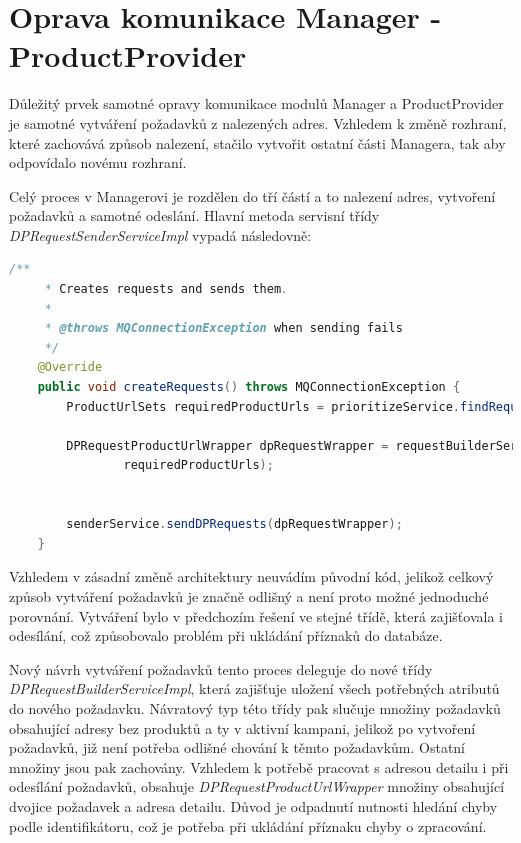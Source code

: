 \documentclass[thesis=B,czech]{FITthesis}[2012/06/26]
\begin{document}
\section{Oprava komunikace Manager - ProductProvider}
Důležitý prvek samotné opravy komunikace modulů Manager a ProductProvider je samotné vytváření požadavků z nalezených adres.
Vzhledem k změně rozhraní, které zachovává způsob nalezení, stačilo vytvořit ostatní části Managera, tak aby odpovídalo novému rozhraní.
\par
Celý proces v Managerovi je rozdělen do tří částí a to nalezení adres, vytvoření požadavků a samotné odeslání. Hlavní metoda servisní třídy \textit{DPRequestSenderServiceImpl} vypadá následovně:
\begin{lstlisting}[language=Java]
    /**
     * Creates requests and sends them.
     *
     * @throws MQConnectionException when sending fails
     */
    @Override
    public void createRequests() throws MQConnectionException {
        ProductUrlSets requiredProductUrls = prioritizeService.findRequiredProductUrls();

        DPRequestProductUrlWrapper dpRequestWrapper = requestBuilderService.create(
                requiredProductUrls);


        senderService.sendDPRequests(dpRequestWrapper);
    }
\end{lstlisting}
Vzhledem v zásadní změně architektury neuvádím původní kód, jelikož celkový způsob vytváření požadavků je značně odlišný a není proto možné jednoduché porovnání. Vytváření bylo v předchozím řešení ve stejné třídě, která zajišťovala i odesílání, což způsobovalo problém při ukládání příznaků do databáze.
\par
Nový návrh vytváření požadavků tento proces deleguje do nové 
třídy  \\ \textit{DPRequestBuilderServiceImpl}, která zajišťuje uložení všech potřebných atributů do nového požadavku. Návratový typ této třídy pak slučuje množiny požadavků obsahující adresy bez produktů a 
ty v aktivní kampani, jelikož po vytvoření požadavků, již není potřeba odlišné chování k těmto požadavkům. Ostatní množiny jsou pak 
zachovány. Vzhledem k potřebě pracovat s adresou detailu i při odesílání požadavků, obsahuje \textit{DPRequestProductUrlWrapper}
množiny obsahující dvojice požadavek a adresa detailu. Důvod je odpadnutí nutnosti hledání chyby podle identifikátoru, což je potřeba
při ukládání příznaku chyby o zpracování.
\end{document}
